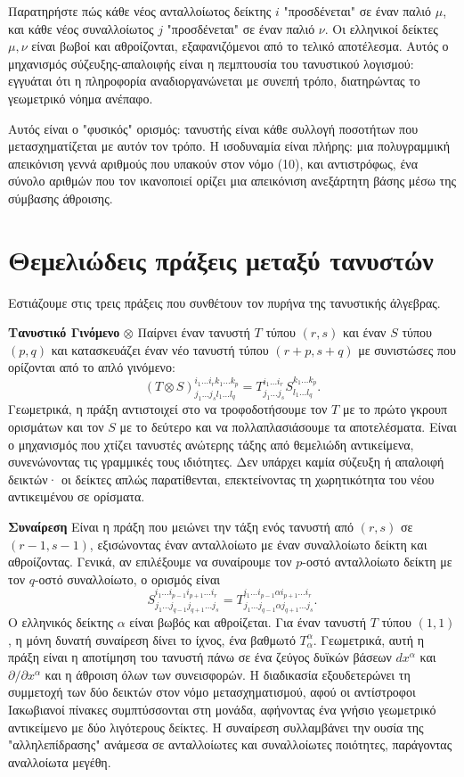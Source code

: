 \documentclass[12pt]{article}
\begin{document}
Παρατηρήστε πώς κάθε νέος ανταλλοίωτος δείκτης \( i \) "προσδένεται" σε έναν παλιό \( \mu \), και κάθε νέος συναλλοίωτος \( j \) "προσδένεται" σε έναν παλιό \( \nu \). Οι ελληνικοί δείκτες \( \mu, \nu \) είναι βωβοί και αθροίζονται, εξαφανιζόμενοι από το τελικό αποτέλεσμα. Αυτός ο μηχανισμός σύζευξης-απαλοιφής είναι η πεμπτουσία του τανυστικού λογισμού: εγγυάται ότι η πληροφορία αναδιοργανώνεται με συνεπή τρόπο, διατηρώντας το γεωμετρικό νόημα ανέπαφο.

Αυτός είναι ο "φυσικός" ορισμός: τανυστής είναι κάθε συλλογή ποσοτήτων που μετασχηματίζεται με αυτόν τον τρόπο. Η ισοδυναμία είναι πλήρης: μια πολυγραμμική απεικόνιση γεννά αριθμούς που υπακούν στον νόμο (10), και αντιστρόφως, ένα σύνολο αριθμών που τον ικανοποιεί ορίζει μια απεικόνιση ανεξάρτητη βάσης μέσω της σύμβασης άθροισης.

\section{Θεμελιώδεις πράξεις μεταξύ τανυστών }

Εστιάζουμε στις τρεις πράξεις που συνθέτουν τον πυρήνα της τανυστικής άλγεβρας.

\textbf{Τανυστικό Γινόμενο} \( \otimes \)  
Παίρνει έναν τανυστή \( T \) τύπου \( (r, s) \) και έναν \( S \) τύπου \( (p, q) \) και κατασκευάζει έναν νέο τανυστή τύπου \( (r+p, s+q) \) με συνιστώσες που ορίζονται από το απλό γινόμενο:
\[
(T \otimes S)^{i_1 \dots i_r k_1 \dots k_p}_{j_1 \dots j_s l_1 \dots l_q} = T^{i_1 \dots i_r}_{j_1 \dots j_s} S^{k_1 \dots k_p}_{l_1 \dots l_q}. \tag{11}
\]
Γεωμετρικά, η πράξη αντιστοιχεί στο να τροφοδοτήσουμε τον \( T \) με το πρώτο γκρουπ ορισμάτων και τον \( S \) με το δεύτερο και να πολλαπλασιάσουμε τα αποτελέσματα. Είναι ο μηχανισμός που χτίζει τανυστές ανώτερης τάξης από θεμελιώδη αντικείμενα, συνενώνοντας τις γραμμικές τους ιδιότητες. Δεν υπάρχει καμία σύζευξη ή απαλοιφή δεικτών· οι δείκτες απλώς παρατίθενται, επεκτείνοντας τη χωρητικότητα του νέου αντικειμένου σε ορίσματα.

\textbf{Συναίρεση}  
Είναι η πράξη που μειώνει την τάξη ενός τανυστή από \( (r, s) \) σε \( (r-1, s-1) \), εξισώνοντας έναν ανταλλοίωτο με έναν συναλλοίωτο δείκτη και αθροίζοντας. Γενικά, αν επιλέξουμε να συναίρουμε τον \( p \)-οστό ανταλλοίωτο δείκτη με τον \( q \)-οστό συναλλοίωτο, ο ορισμός είναι
\[
S^{i_1 \dots i_{p-1} i_{p+1} \dots i_r}_{j_1 \dots j_{q-1} j_{q+1} \dots j_s} = T^{i_1 \dots i_{p-1} \alpha i_{p+1} \dots i_r}_{j_1 \dots j_{q-1} \alpha j_{q+1} \dots j_s}. \tag{12}
\]
Ο ελληνικός δείκτης \( \alpha \) είναι βωβός και αθροίζεται. Για έναν τανυστή \( T \) τύπου \( (1,1) \), η μόνη δυνατή συναίρεση δίνει το ίχνος, ένα βαθμωτό \( T^\alpha_\alpha \). Γεωμετρικά, αυτή η πράξη είναι η αποτίμηση του τανυστή πάνω σε ένα ζεύγος δυϊκών βάσεων \( dx^\alpha \) και \( \partial / \partial x^\alpha \) και η άθροιση όλων των συνεισφορών. Η διαδικασία εξουδετερώνει τη συμμετοχή των δύο δεικτών στον νόμο μετασχηματισμού, αφού οι αντίστροφοι Ιακωβιανοί πίνακες συμπτύσσονται στη μονάδα, αφήνοντας ένα γνήσιο γεωμετρικό αντικείμενο με δύο λιγότερους δείκτες. Η συναίρεση συλλαμβάνει την ουσία της "αλληλεπίδρασης" ανάμεσα σε ανταλλοίωτες και συναλλοίωτες ποιότητες, παράγοντας αναλλοίωτα μεγέθη.
\end{document}
